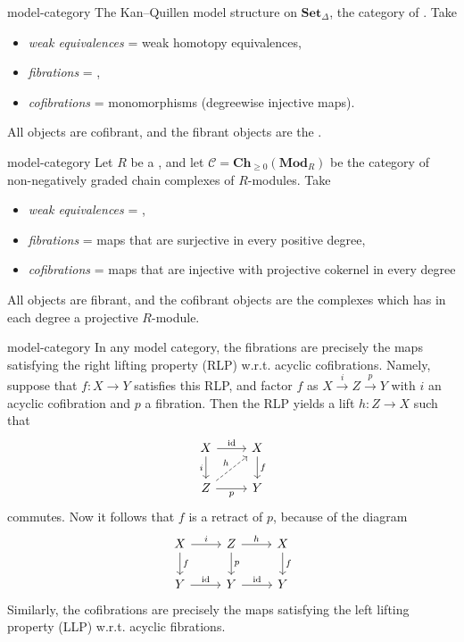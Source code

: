 \begin{example}{model-category}
    The Kan--Quillen model structure on $\textbf{Set}_\Delta$, the category of . Take
    \begin{itemize}
        \item \textit{weak equivalences} = weak homotopy equivalences,
        \item \textit{fibrations} = ,
        \item \textit{cofibrations} = monomorphisms (degreewise injective maps).
    \end{itemize}
    All objects are cofibrant, and the fibrant objects are the .
\end{example}

\begin{example}{model-category}
    Let $R$ be a , and let $\mathcal{C} = \textbf{Ch}_{\ge 0}(\textbf{Mod}_R)$ be the category of non-negatively graded chain complexes of $R$-modules. Take
    \begin{itemize}
        \item \textit{weak equivalences} = ,
        \item \textit{fibrations} = maps that are surjective in every positive degree,
        \item \textit{cofibrations} = maps that are injective with projective cokernel in every degree
    \end{itemize}
    All objects are fibrant, and the cofibrant objects are the complexes which has in each degree a projective $R$-module.
\end{example}

\begin{example}{model-category}
    In any model category, the fibrations are precisely the maps satisfying the right lifting property (RLP) w.r.t. acyclic cofibrations. Namely, suppose that $f \colon X \to Y$ satisfies this RLP, and factor $f$ as $X \xrightarrow{i} Z \xrightarrow{p} Y$ with $i$ an acyclic cofibration and $p$ a fibration. Then the RLP yields a lift $h \colon Z \to X$ such that
    \[ \svg \begin{tikzcd} X \arrow{r}{\id} \arrow[swap]{d}{i} & X \arrow{d}{f} \\ Z \arrow[dashed]{ur}{h} \arrow[swap]{r}{p} & Y \end{tikzcd} \]
    commutes. Now it follows that $f$ is a retract of $p$, because of the diagram
    \[ \svg \begin{tikzcd} X \arrow{r}{i} \arrow{d}{f} & Z \arrow{d}{p} \arrow{r}{h} & X \arrow{d}{f} \\ Y \arrow{r}{\id} & Y \arrow{r}{\id} & Y \end{tikzcd} \]
    Similarly, the cofibrations are precisely the maps satisfying the left lifting property (LLP) w.r.t. acyclic fibrations.
\end{example}

